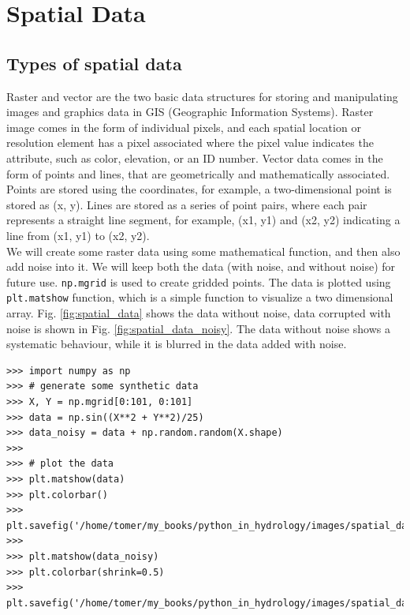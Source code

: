 \documentclass[10pt]{book}
\begin{document}
{\chapter{Spatial Data}
\section{Types of spatial data}
Raster and vector are the two basic data structures for storing and manipulating images and graphics data in GIS (Geographic Information Systems). Raster image comes in the form of individual pixels, and each spatial location or resolution element has a pixel associated where the pixel value indicates the attribute, such as color, elevation, or an ID number. Vector data comes in the form of points and lines, that are geometrically and mathematically associated. Points are stored using the coordinates, for example, a two-dimensional point is stored as (x, y). Lines are stored as a series of point pairs, where each pair represents a straight line segment, for example, (x1, y1) and (x2, y2) indicating a line from (x1, y1) to (x2, y2).\\

We will create some raster data using some mathematical function, and then also add noise into it. We will keep both the data (with noise, and without noise) for future use. \verb"np.mgrid" is used to create gridded points. The data is plotted using \verb"plt.matshow" function, which is a simple function to visualize a two dimensional array. Fig. \ref{fig:spatial_data} shows the data without noise, data corrupted with noise is shown in Fig. \ref{fig:spatial_data_noisy}. The data without noise shows a systematic behaviour, while it is blurred in the data added with noise.

\beforeverb \begin{verbatim}
>>> import numpy as np
>>> # generate some synthetic data
>>> X, Y = np.mgrid[0:101, 0:101]
>>> data = np.sin((X**2 + Y**2)/25) 
>>> data_noisy = data + np.random.random(X.shape)
>>>    
>>> # plot the data
>>> plt.matshow(data)
>>> plt.colorbar()
>>> plt.savefig('/home/tomer/my_books/python_in_hydrology/images/spatial_data.png')
>>> 
>>> plt.matshow(data_noisy)
>>> plt.colorbar(shrink=0.5)
>>> plt.savefig('/home/tomer/my_books/python_in_hydrology/images/spatial_data_noisy.png')
\end{verbatim} \afterverb

}
\end{document}
